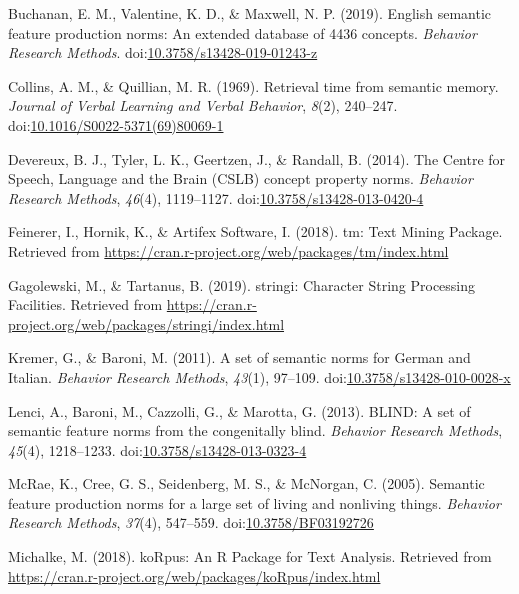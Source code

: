 \documentclass[man]{apa6}
\begin{document}
\leavevmode\hypertarget{ref-Buchanan2019}{}%
Buchanan, E. M., Valentine, K. D., \& Maxwell, N. P. (2019). English semantic feature production norms: An extended database of 4436 concepts. \emph{Behavior Research Methods}. doi:\href{https://doi.org/10.3758/s13428-019-01243-z}{10.3758/s13428-019-01243-z}

\leavevmode\hypertarget{ref-Collins1969}{}%
Collins, A. M., \& Quillian, M. R. (1969). Retrieval time from semantic memory. \emph{Journal of Verbal Learning and Verbal Behavior}, \emph{8}(2), 240--247. doi:\href{https://doi.org/10.1016/S0022-5371(69)80069-1}{10.1016/S0022-5371(69)80069-1}

\leavevmode\hypertarget{ref-Devereux2014}{}%
Devereux, B. J., Tyler, L. K., Geertzen, J., \& Randall, B. (2014). The Centre for Speech, Language and the Brain (CSLB) concept property norms. \emph{Behavior Research Methods}, \emph{46}(4), 1119--1127. doi:\href{https://doi.org/10.3758/s13428-013-0420-4}{10.3758/s13428-013-0420-4}

\leavevmode\hypertarget{ref-Feinerer2018}{}%
Feinerer, I., Hornik, K., \& Artifex Software, I. (2018). tm: Text Mining Package. Retrieved from \url{https://cran.r-project.org/web/packages/tm/index.html}

\leavevmode\hypertarget{ref-Gagolewski2019}{}%
Gagolewski, M., \& Tartanus, B. (2019). stringi: Character String Processing Facilities. Retrieved from \url{https://cran.r-project.org/web/packages/stringi/index.html}

\leavevmode\hypertarget{ref-Kremer2011a}{}%
Kremer, G., \& Baroni, M. (2011). A set of semantic norms for German and Italian. \emph{Behavior Research Methods}, \emph{43}(1), 97--109. doi:\href{https://doi.org/10.3758/s13428-010-0028-x}{10.3758/s13428-010-0028-x}

\leavevmode\hypertarget{ref-Lenci2013}{}%
Lenci, A., Baroni, M., Cazzolli, G., \& Marotta, G. (2013). BLIND: A set of semantic feature norms from the congenitally blind. \emph{Behavior Research Methods}, \emph{45}(4), 1218--1233. doi:\href{https://doi.org/10.3758/s13428-013-0323-4}{10.3758/s13428-013-0323-4}

\leavevmode\hypertarget{ref-McRae2005}{}%
McRae, K., Cree, G. S., Seidenberg, M. S., \& McNorgan, C. (2005). Semantic feature production norms for a large set of living and nonliving things. \emph{Behavior Research Methods}, \emph{37}(4), 547--559. doi:\href{https://doi.org/10.3758/BF03192726}{10.3758/BF03192726}

\leavevmode\hypertarget{ref-Michalke2018}{}%
Michalke, M. (2018). koRpus: An R Package for Text Analysis. Retrieved from \url{https://cran.r-project.org/web/packages/koRpus/index.html}
\end{document}
